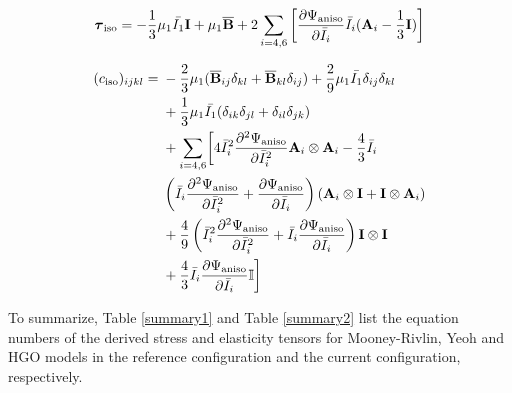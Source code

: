 \begin{appendices}
\begin{equation} \label{HGO_tauiso}
\boldsymbol{\tau}_\mathrm{iso} =  - \frac{1}{3}\mu_1\bar{I_1}\bold{I} + \mu_1{\overline{\bold{B}}}
+ 2\sum_{i = 4, 6}\left[\frac{\partial{\Psi_\mathrm{aniso}}}{\partial{\bar{I}_i}}\bar{I}_i (\bold{A}_{i} - \frac{1}{3}\bold{I})\right]
\end{equation}


\begin{equation} \label{HGO_spatial_ciso}
\begin{split}
(c_\mathrm{iso})_{ijkl} = {} &  - \frac{2}{3}\mu_1({\overline{\bold{B}}}_{ij}\delta_{kl} + {\overline{\bold{B}}}_{kl}\delta_{ij}) 
+ \frac{2}{9}\mu_1\bar{I_1}  \delta_{ij}\delta_{kl} \\
&+ \frac{1}{3}\mu_1\bar{I_1} (\delta_{ik}\delta_{jl} + \delta_{il}\delta_{jk}) \\
&+ 
\sum_{i = 4, 6} \biggl[4{\bar{I}_i}^2\frac{\partial^2\Psi_\mathrm{aniso}}{\partial{\bar{I}_i}^2} \bold{A}_{i} \otimes \bold{A}_{i} - \frac{4}{3}\bar{I}_i \\ & \left(\bar{I}_i\frac{\partial^2\Psi_\mathrm{aniso}}{\partial{\bar{I}_i}^2} + \frac{\partial\Psi_\mathrm{aniso}}{\partial{\bar{I}_i}}\right)
 (\bold{A}_{i} \otimes \bold{I} + \bold{I} \otimes \bold{A}_i) \\
&+ 
\frac{4}{9}\left({\bar{I}_i}^2\frac{\partial^2\Psi_\mathrm{aniso}}{\partial{\bar{I}_i}^2} + \bar{I}_i\frac{\partial\Psi_\mathrm{aniso}}{\partial{\bar{I}_i}}\right)\bold{I} \otimes \bold{I} \\
&+ \frac{4}{3}\bar{I}_i \frac{\partial\Psi_\mathrm{aniso}}{\partial{\bar{I}_i}} \mathbb{I} \biggr]
\end{split}
\end{equation}

To summarize, Table \ref{summary1} and Table \ref{summary2} list the equation numbers of the derived stress and elasticity tensors for Mooney-Rivlin, Yeoh and HGO models in the reference configuration and the current configuration, respectively.

\end{appendices}
